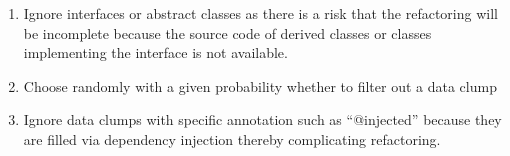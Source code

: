 \begin{enumerate}
    \item Ignore interfaces or abstract classes as there is a risk that the refactoring will be incomplete because the source code of derived classes or classes implementing the interface is not available. 

    \item Choose randomly with a given probability whether to filter out a data clump
    \item Ignore data clumps with specific annotation such as \enquote{@injected} because they are filled via dependency injection thereby complicating refactoring.
 
\end{enumerate}

